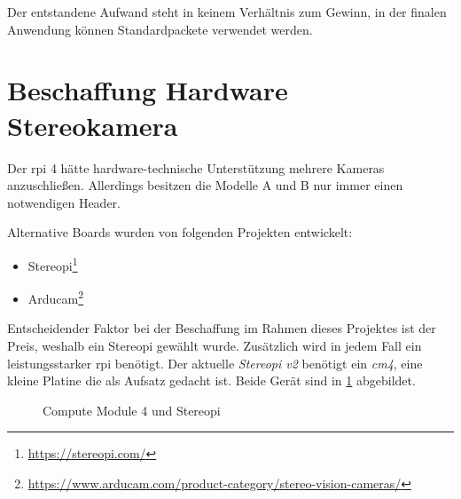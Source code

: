 Der entstandene Aufwand steht in keinem Verhältnis zum Gewinn, in der finalen Anwendung können Standardpackete verwendet werden.

\section{Beschaffung Hardware Stereokamera}
Der \gls{rpi} 4 hätte hardware-technische Unterstützung mehrere Kameras anzuschließen. Allerdings besitzen die Modelle A und B nur immer einen notwendigen Header.

Alternative Boards wurden von folgenden Projekten entwickelt:
\begin{itemize}
    \item Stereopi\footnote{\url{https://stereopi.com/}}
    \item Arducam\footnote{\url{https://www.arducam.com/product-category/stereo-vision-cameras/}}
\end{itemize}

Entscheidender Faktor bei der Beschaffung im Rahmen dieses Projektes ist der Preis, weshalb ein Stereopi gewählt wurde. Zusätzlich wird in jedem Fall ein leistungsstarker \gls{rpi} benötigt. Der aktuelle \textit{Stereopi v2} benötigt ein \textit{\gls{cm4}}, eine kleine Platine die als Aufsatz gedacht ist. Beide Gerät sind in \ref{fig:stereopi_intro} abgebildet.

\begin{figure}[!ht]
    \centering
    \hfill
    \hfill
    \caption[Compute Module 4 und Stereopi]{Compute Module 4 und Stereopi}
    \label{fig:stereopi_intro}
\end{figure}

